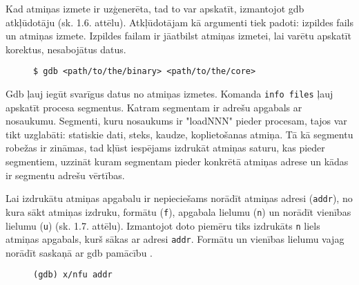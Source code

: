 Kad atmiņas izmete ir uzģenerēta, tad to var apskatīt, izmantojot gdb atkļūdotāju (sk. 1.6. attēlu). 
Atkļūdotājam kā argumenti tiek padoti: izpildes fails un atmiņas izmete. 
Izpildes failam ir jāatbilst atmiņas izmetei, lai varētu apskatīt korektus, nesabojātus datus.

\begin{figure}[h]
\begin{lstlisting}
$ gdb <path/to/the/binary> <path/to/the/core>
\end{lstlisting}
\caption{\textbf{\fontsize{11}{12}\selectfont {Atmiņas izmetes atvēršana, izmantojot gdb atkļūdotāju}}}
\end{figure}

Gdb ļauj iegūt svarīgus datus no atmiņas izmetes. Komanda \texttt{info files} ļauj apskatīt procesa segmentus. 
Katram segmentam ir adrešu apgabals ar nosaukumu. 
Segmenti, kuru nosaukums ir "loadNNN" pieder procesam, tajos var tikt uzglabāti: statiskie dati, steks, kaudze, koplietošanas atmiņa.
Tā kā segmentu robežas ir zināmas, tad kļūst iespējams izdrukāt atmiņas saturu, kas pieder segmentiem, uzzināt kuram segmentam pieder konkrētā atmiņas adrese un kādas ir segmentu adrešu vērtības.

Lai izdrukātu atmiņas apgabalu ir nepieciešams norādīt atmiņas adresi (\texttt{addr}), no kura sākt atmiņas izdruku, formātu (\texttt{f}), apgabala lielumu (\texttt{n}) un norādīt vienības lielumu (\texttt{u}) (sk. 1.7. attēlu). 
Izmantojot doto piemēru tiks izdrukāts \texttt{n} liels atmiņas apgabals, kurš sākas ar adresi \texttt{addr}. Formātu un vienības lielumu vajag norādīt saskaņā ar gdb pamācību \cite{gdb}. 

\begin{figure}[h]
\begin{lstlisting}
(gdb) x/nfu addr
\end{lstlisting}
\caption{\textbf{\fontsize{11}{12}\selectfont {Atmiņas apgabala izdrukāšanas formāts}}}
\end{figure}

